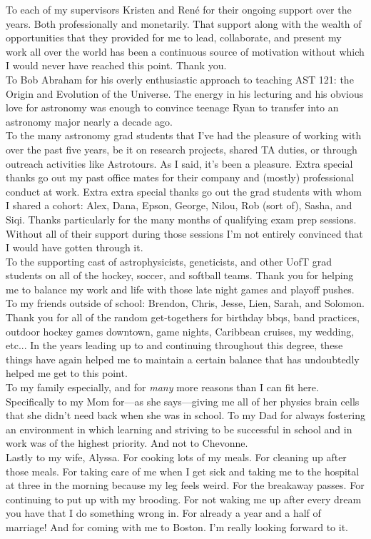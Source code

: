 To each of my supervisors Kristen and Ren\'e for their ongoing support over the
years. Both professionally and monetarily. That support along with the wealth
of opportunities that they provided for me to lead, collaborate, and
present my work all over the world has been a continuous source of motivation
without which I would never have reached this point. Thank you. \\

To Bob Abraham for his overly enthusiastic approach to teaching AST
121: the Origin and Evolution of the Universe. The energy in his lecturing
and his obvious love for astronomy was enough to convince teenage Ryan to
transfer into an astronomy major nearly a decade ago.  \\

To the many astronomy grad students that I've had the pleasure of working with
over the past five years, be it on research projects, shared TA duties, or
through outreach activities like Astrotours. As I said, it's been a pleasure.
Extra special thanks go out my past office mates for their company and
(mostly) professional conduct at work.
Extra extra special thanks go out the grad students with whom I shared a
cohort: Alex, Dana, Epson,
George, Nilou, Rob (sort of), Sasha, and Siqi. Thanks particularly for the many
months of qualifying exam prep sessions. Without all of their support during those
sessions I'm not entirely convinced that I would have gotten through it. \\

To the supporting cast of
astrophysicists, geneticists, and other UofT grad students on all of the
hockey, soccer, and softball teams. Thank you for helping me to balance my work
and life with those late night games and playoff pushes. \\

To my friends outside of school: Brendon, Chris, Jesse, Lien, Sarah, and
Solomon.
Thank you for all of the random get-togethers for birthday bbqs, band practices,
outdoor hockey games downtown, game nights, Caribbean cruises, my wedding, etc... 
In the years leading up to and continuing throughout this degree, these things
have again helped me to maintain a certain balance that has undoubtedly helped
me get to this point. \\

To my family especially, and for \emph{many} more reasons than I can fit here. 
Specifically to my Mom for---as she says---giving me all of her physics
brain cells that she didn't need back when she was in school. To my Dad for
always fostering an environment in which learning and striving to be
successful in school and in work was of the highest priority. And not to
Chevonne. \\

Lastly to my wife, Alyssa. For cooking lots of my meals. For cleaning up after those
meals. For taking care of me when I get sick and taking me to the hospital at three
in the morning because my leg feels weird. For the breakaway passes.
For continuing to put up with my brooding. For not waking me up after every
dream you have that I do something wrong in. For already a year and a half of
marriage! And for coming with me to Boston. I'm really looking forward to it.
